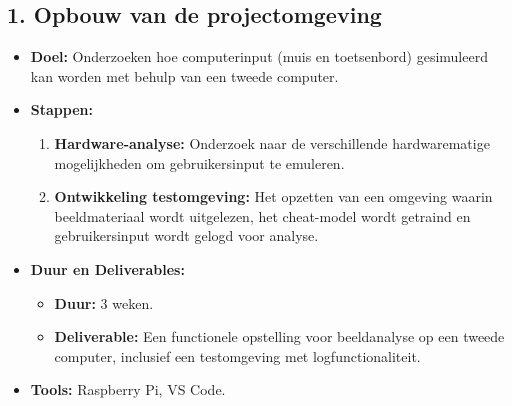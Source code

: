\subsection{1. Opbouw van de projectomgeving}
\begin{itemize}
    \item \textbf{Doel:} Onderzoeken hoe computerinput (muis en toetsenbord) gesimuleerd kan worden met behulp van een tweede computer.
    \item \textbf{Stappen:}
    \begin{enumerate}
        \item \textbf{Hardware-analyse:} Onderzoek naar de verschillende hardwarematige mogelijkheden om gebruikersinput te emuleren.
        \item \textbf{Ontwikkeling testomgeving:} Het opzetten van een omgeving waarin beeldmateriaal wordt uitgelezen, het cheat-model wordt getraind en gebruikersinput wordt gelogd voor analyse.
    \end{enumerate}
    \item \textbf{Duur en Deliverables:}
    \begin{itemize}
        \item \textbf{Duur:} 3 weken.
        \item \textbf{Deliverable:} Een functionele opstelling voor beeldanalyse op een tweede computer, inclusief een testomgeving met logfunctionaliteit.
    \end{itemize}
    \item \textbf{Tools:} Raspberry Pi, VS Code.
\end{itemize}

